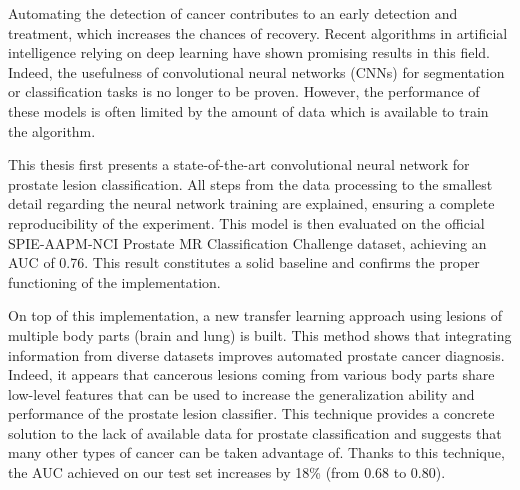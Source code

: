 Automating the detection of cancer contributes to an early detection and treatment, which increases the chances of recovery. Recent algorithms in artificial intelligence relying on deep learning have shown promising results in this field. Indeed, the usefulness of convolutional neural networks (CNNs) for segmentation or classification tasks is no longer to be proven. However, the performance of these models is often limited by the amount of data which is available to train the algorithm.

This thesis first presents a state-of-the-art convolutional neural network for pro\-state lesion classification. All steps from the data processing to the smallest detail regarding the neural network training are explained, ensuring a complete reproducibility of the experiment. This model is then evaluated on the official SPIE-AAPM-NCI Prostate MR Classification Challenge dataset, achieving an AUC of 0.76. This result constitutes a solid baseline and confirms the proper functioning of the implementation.

On top of this implementation, a new transfer learning approach using lesions of multiple body parts (brain and lung) is built. This method shows that integrating information from diverse datasets improves automated prostate cancer diagnosis. Indeed, it appears that cancerous lesions coming from various body parts share low-level features that can be used to increase the generalization ability and performance of the prostate lesion classifier. This technique provides a concrete solution to the lack of available data for prostate classification and suggests that many other types of cancer can be taken advantage of. Thanks to this technique, the AUC achieved on our test set increases by 18\% (from 0.68 to 0.80). 
